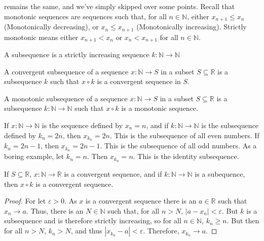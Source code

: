         remains the same, and we've simply skipped over
        some points. Recall that
        monotonic sequences are sequences such
        that, for all $n\in\mathbb{N}$, either
        $x_{n+1}\leq{x_{n}}$ (Monotonically decreasing),
        or $x_{n}\leq{x_{n+1}}$ (Monotonically increasing).
        Strictly monotonic means either $x_{n+1}<x_{n}$
        or $x_{n}<x_{n+1}$ for all $n\in\mathbb{N}$.
        \begin{definition}
            A subsequence is a strictly increasing sequence
            $k:\mathbb{N}\rightarrow\mathbb{N}$
        \end{definition}
        \begin{definition}
            A convergent subsequence of a sequence
            $x:\mathbb{N}\rightarrow{S}$ in
            a subset $S\subseteq\mathbb{R}$ is a
            subsequence $k$ such that
            $x\circ{k}$ is a convergent sequence in $S$.
        \end{definition}
        \begin{definition}
            A monotonic subsequence of a sequence
            $x:\mathbb{N}\rightarrow{S}$ in a subset
            $S\subseteq\mathbb{R}$ is a subsequence
            $k:\mathbb{N}\rightarrow\mathbb{N}$ such
            that $x\circ{k}$ is a monotonic sequence.
        \end{definition}
        \begin{example}
            If $x:\mathbb{N}\rightarrow\mathbb{N}$ is
            the sequence defined by $x_{n}=n$, and if
            $k:\mathbb{N}\rightarrow\mathbb{N}$ is the
            subsequence defined by
            $k_{n}=2n$, then $x_{k_{n}}=2n$. This is the
            subsequence of all even numbers.
            If $k_{n}=2n-1$, then $x_{k_{n}}=2n-1$. This
            is the subsequence of all odd numbers. As a
            boring example, let $k_{n}=n$. Then
            $x_{k_{n}}=n$. This is the identity subsequence.
        \end{example}
        \begin{theorem}
            If $S\subseteq\mathbb{R}$,
            $x:\mathbb{N}\rightarrow\mathbb{R}$ is a
            convergent sequence, and if
            $k:\mathbb{N}\rightarrow\mathbb{N}$ is a
            subequence, then $x\circ{k}$ is a convergent
            sequence.
        \end{theorem}
        \begin{proof}
            For let $\varepsilon>0$.
            As $x$ is a convergent sequence there is
            an $a\in\mathbb{R}$ such that
            $x_{n}\rightarrow{a}$. Thus, there is an
            $N\in\mathbb{N}$ such that, for all
            $n>N$, $|a-x_{n}|<\varepsilon$. But
            $k$ is a subsequence and is therefore
            strictly increasing, so
            for all $n\in\mathbb{N}$, $k_{n}\geq{n}$.
            But then for all $n>N$, $k_{n}>N$, and thus
            $|x_{k_{n}}-a|<\varepsilon$. Therefore,
            $x_{k_{n}}\rightarrow{a}$.
        \end{proof}
